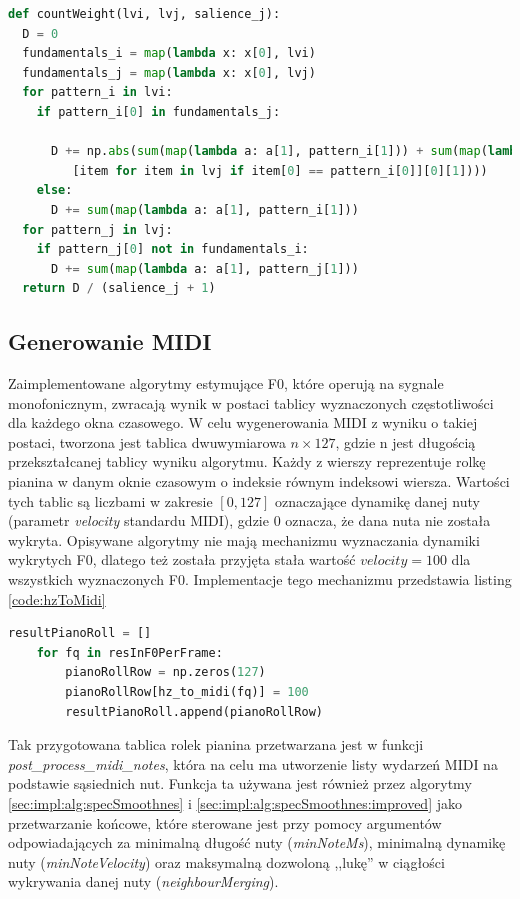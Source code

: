 \documentclass[12pt,a4paper,twoside]{mwart}
\begin{document}
\begin{lstlisting}[language=Python, caption={Funkcja wyliczająca wagę krawędzi w algorytmie śledzenia wysokości nut}, captionpos=b, label={code:petrusPitchTracking}, numbers=none]
def countWeight(lvi, lvj, salience_j):
  D = 0
  fundamentals_i = map(lambda x: x[0], lvi)
  fundamentals_j = map(lambda x: x[0], lvj)
  for pattern_i in lvi:
    if pattern_i[0] in fundamentals_j:
      
      D += np.abs(sum(map(lambda a: a[1], pattern_i[1])) + sum(map(lambda a: a[1],
         [item for item in lvj if item[0] == pattern_i[0]][0][1])))
    else:
      D += sum(map(lambda a: a[1], pattern_i[1]))
  for pattern_j in lvj:
    if pattern_j[0] not in fundamentals_i:
      D += sum(map(lambda a: a[1], pattern_j[1]))
  return D / (salience_j + 1)
\end{lstlisting}

\subsection{Generowanie MIDI}\label{sec:impl:midiGen}
Zaimplementowane algorytmy estymujące F0, które operują na sygnale monofonicznym, zwracają wynik w postaci tablicy wyznaczonych częstotliwości dla każdego okna czasowego. W celu wygenerowania MIDI z wyniku o takiej postaci, tworzona jest tablica dwuwymiarowa $n \times 127$, gdzie n jest długością przekształcanej tablicy wyniku algorytmu. Każdy z wierszy reprezentuje rolkę pianina w danym oknie czasowym o indeksie równym indeksowi wiersza. Wartości tych tablic są liczbami w zakresie $\left[0, 127\right]$ oznaczające dynamikę danej nuty (parametr \textit{velocity} standardu MIDI), gdzie 0 oznacza, że dana nuta nie została wykryta. Opisywane algorytmy nie mają mechanizmu wyznaczania dynamiki wykrytych F0, dlatego też została przyjęta stała wartość $velocity = 100$ dla wszystkich wyznaczonych F0. Implementacje tego mechanizmu przedstawia listing \ref{code:hzToMidi}

\begin{lstlisting}[language=Python, caption={Funkcja wyliczająca wagę krawędzi w algorytmie śledzenia wysokości nut}, captionpos=b, label={code:hzToMidi}, numbers=none]
	resultPianoRoll = []
	for fq in resInF0PerFrame:
		pianoRollRow = np.zeros(127)
		pianoRollRow[hz_to_midi(fq)] = 100
		resultPianoRoll.append(pianoRollRow)
\end{lstlisting}

Tak przygotowana tablica rolek pianina przetwarzana jest w funkcji \textit{post\_process\_midi\_notes}, która na celu ma utworzenie listy wydarzeń MIDI na podstawie sąsiednich nut. Funkcja ta używana jest również przez algorytmy \ref{sec:impl:alg:specSmoothnes} i \ref{sec:impl:alg:specSmoothnes:improved} jako przetwarzanie końcowe, które sterowane jest przy pomocy argumentów odpowiadających za minimalną długość nuty (\textit{minNoteMs}), minimalną dynamikę nuty (\textit{minNoteVelocity}) oraz maksymalną dozwoloną ,,lukę'' w ciągłości wykrywania danej nuty (\textit{neighbourMerging}).
\end{document}
